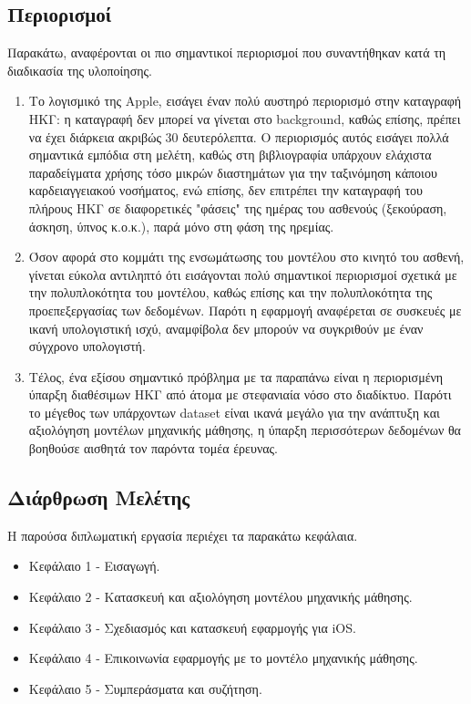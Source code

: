 \subsection{Περιορισμοί}

Παρακάτω, αναφέρονται οι πιο σημαντικοί περιορισμοί που συναντήθηκαν κατά τη διαδικασία της υλοποίησης.

\begin{enumerate}
    \item Το λογισμικό της Apple, εισάγει έναν πολύ αυστηρό περιορισμό στην καταγραφή ΗΚΓ: η καταγραφή δεν μπορεί να γίνεται στο background, καθώς επίσης, πρέπει να έχει διάρκεια ακριβώς 30 δευτερόλεπτα. Ο περιορισμός αυτός εισάγει πολλά σημαντικά εμπόδια στη μελέτη, καθώς στη βιβλιογραφία υπάρχουν ελάχιστα παραδείγματα χρήσης τόσο μικρών διαστημάτων για την ταξινόμηση κάποιου καρδειαγγειακού νοσήματος, ενώ επίσης, δεν επιτρέπει την καταγραφή του πλήρους ΗΚΓ σε διαφορετικές "φάσεις" της ημέρας του ασθενούς (ξεκούραση, άσκηση, ύπνος κ.ο.κ.), παρά μόνο στη φάση της ηρεμίας.
    \item Όσον αφορά στο κομμάτι της ενσωμάτωσης του μοντέλου στο κινητό του ασθενή, γίνεται εύκολα αντιληπτό ότι εισάγονται πολύ σημαντικοί περιορισμοί σχετικά με την πολυπλοκότητα του μοντέλου, καθώς επίσης και την πολυπλοκότητα της προεπεξεργασίας των δεδομένων. Παρότι η εφαρμογή αναφέρεται σε συσκευές με ικανή υπολογιστική ισχύ, αναμφίβολα δεν μπορούν να συγκριθούν με έναν σύγχρονο υπολογιστή.
    \item Τέλος, ένα εξίσου σημαντικό πρόβλημα με τα παραπάνω είναι η περιορισμένη ύπαρξη διαθέσιμων ΗΚΓ από άτομα με στεφανιαία νόσο στο διαδίκτυο. Παρότι το μέγεθος των υπάρχοντων dataset είναι ικανά μεγάλο για την ανάπτυξη και αξιολόγηση μοντέλων μηχανικής μάθησης, η ύπαρξη περισσότερων δεδομένων θα βοηθούσε αισθητά τον παρόντα τομέα έρευνας.
\end{enumerate}

\subsection{Διάρθρωση Μελέτης}

Η παρούσα διπλωματική εργασία περιέχει τα παρακάτω κεφάλαια.

\begin{itemize}
    \item Κεφάλαιο 1 - Εισαγωγή.
    \item Κεφάλαιο 2 - Κατασκευή και αξιολόγηση μοντέλου μηχανικής μάθησης.
    \item Κεφάλαιο 3 - Σχεδιασμός και κατασκευή εφαρμογής για iOS.
    \item Κεφάλαιο 4 - Επικοινωνία εφαρμογής με το μοντέλο μηχανικής μάθησης.
    \item Κεφάλαιο 5 - Συμπεράσματα και συζήτηση.
\end{itemize}
